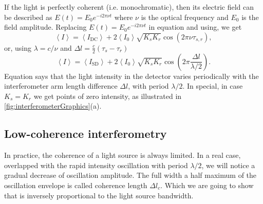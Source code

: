 \documentclass[12pt,twoside,english]{book}
\renewcommand{\~}{\perispomeni}%
\numberwithin{equation}{section}
\numberwithin{figure}{section}
\begin{document}
If the light is perfectly coherent (i.e. monochromatic), then its electric field can be described as $E\left(t\right)=E_{0}e^{-i2\pi\nu t}$ where $\nu$ is the optical frequency and $E_{0}$ is the field amplitude. Replacing $E\left(t\right)=E_{0}e^{-i2\pi\nu t}$ in equation and using, we get
\begin{equation}
\left\langle I\right\rangle =\left\langle I_{\text{DC}}\right\rangle +2\left\langle I_{0}\right\rangle \sqrt{K_{s}K_{r}}\cos\left(2\pi\nu\tau_{s,r}\right),\label{eq:interference coherent delay}\end{equation}
or, using $\lambda=c/\nu$ and $\Delta l=\frac{c}{2}\left(\tau_{s}-\tau_{r}\right)$
\begin{equation}
\left\langle I\right\rangle =\left\langle I_{\text{SD}}\right\rangle +2\left\langle I_{0}\right\rangle \sqrt{K_{s}K_{r}}\cos\left(2\pi\frac{\Delta l}{\lambda/2}\right).\label{eq:interference coherent length}\end{equation}
Equation says that the light intensity in the detector varies periodically with the interferometer arm length difference $\Delta l$, with period $\lambda/2$. In special, in case $K_{s}=K_{r}$ we get points of zero intensity, as illustrated in \ref{fig:interferometerGraphics}(a).


\subsection{Low-coherence interferometry}
\label{sub:Low-coherence interferometry}

In practice, the coherence of a light source is always limited. In a real case, overlapped with the rapid intensity oscillation with period $\lambda/2$, we will notice a gradual decrease of oscillation amplitude. The full width a half maximum of the oscillation envelope is called \gls{coherence length} $\Delta l_{c}$. Which we are going to show that is inversely proportional to the light source bandwidth.
\end{document}
